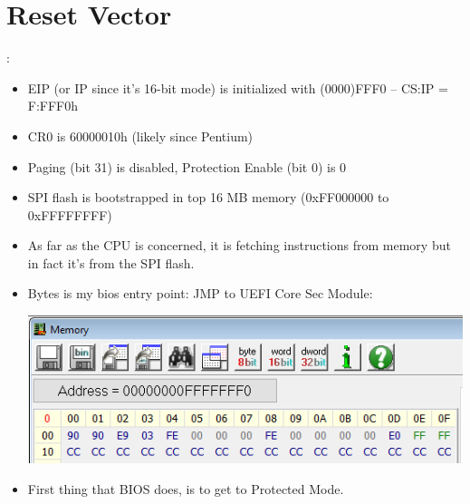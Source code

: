 \section{Reset Vector}
\begin{note}:
\begin{itemize}
	\item EIP (or IP since it’s 16-bit mode) is initialized with (0000)FFF0	– CS:IP = F:FFF0h
	\item CR0 is 60000010h (likely since Pentium)
	\item Paging (bit 31) is disabled, Protection Enable (bit 0) is 0
	\item SPI flash is bootstrapped in top 16 MB memory (0xFF000000 to 0xFFFFFFFF)
	\item As far as the CPU is concerned, it is fetching instructions from memory but in fact it’s from the SPI flash.
	\item Bytes is my bios entry point: JMP to UEFI Core Sec Module:
	\begin{center}
		\includegraphics[scale=0.8]{Images/UEFI/ResetVector1}
	\end{center}
	\item First thing that BIOS does, is to get to Protected Mode.
	
\end{itemize}

\end{note}
